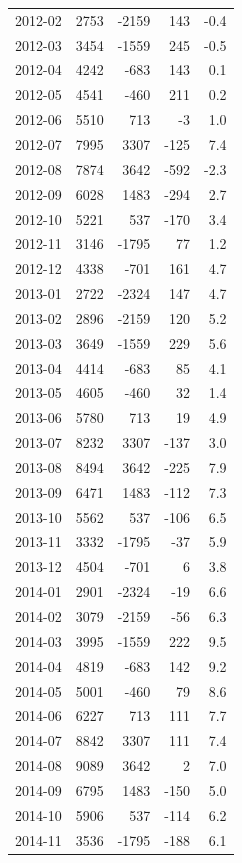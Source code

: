 \begin{longtable}{lrrrr}
2012-02 & 2753 & -2159 & 143 & -0.4 \\
2012-03 & 3454 & -1559 & 245 & -0.5 \\
2012-04 & 4242 & -683 & 143 & 0.1 \\
2012-05 & 4541 & -460 & 211 & 0.2 \\
2012-06 & 5510 & 713 & -3 & 1.0 \\
2012-07 & 7995 & 3307 & -125 & 7.4 \\
2012-08 & 7874 & 3642 & -592 & -2.3 \\
2012-09 & 6028 & 1483 & -294 & 2.7 \\
2012-10 & 5221 & 537 & -170 & 3.4 \\
2012-11 & 3146 & -1795 & 77 & 1.2 \\
2012-12 & 4338 & -701 & 161 & 4.7 \\
2013-01 & 2722 & -2324 & 147 & 4.7 \\
2013-02 & 2896 & -2159 & 120 & 5.2 \\
2013-03 & 3649 & -1559 & 229 & 5.6 \\
2013-04 & 4414 & -683 & 85 & 4.1 \\
2013-05 & 4605 & -460 & 32 & 1.4 \\
2013-06 & 5780 & 713 & 19 & 4.9 \\
2013-07 & 8232 & 3307 & -137 & 3.0 \\
2013-08 & 8494 & 3642 & -225 & 7.9 \\
2013-09 & 6471 & 1483 & -112 & 7.3 \\
2013-10 & 5562 & 537 & -106 & 6.5 \\
2013-11 & 3332 & -1795 & -37 & 5.9 \\
2013-12 & 4504 & -701 & 6 & 3.8 \\
2014-01 & 2901 & -2324 & -19 & 6.6 \\
2014-02 & 3079 & -2159 & -56 & 6.3 \\
2014-03 & 3995 & -1559 & 222 & 9.5 \\
2014-04 & 4819 & -683 & 142 & 9.2 \\
2014-05 & 5001 & -460 & 79 & 8.6 \\
2014-06 & 6227 & 713 & 111 & 7.7 \\
2014-07 & 8842 & 3307 & 111 & 7.4 \\
2014-08 & 9089 & 3642 & 2 & 7.0 \\
2014-09 & 6795 & 1483 & -150 & 5.0 \\
2014-10 & 5906 & 537 & -114 & 6.2 \\
2014-11 & 3536 & -1795 & -188 & 6.1 \\

\end{longtable}
